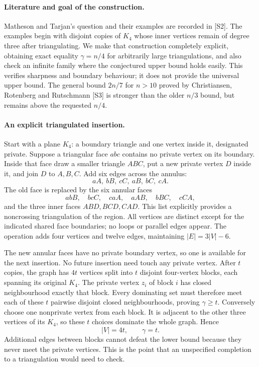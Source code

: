 \documentclass[11pt,a4paper]{article}
\begin{document}
\paragraph{Literature and goal of the construction.}
Matheson and Tarjan's question and their examples are recorded in [S2]. The examples begin with disjoint copies of $K_4$ whose inner vertices remain of degree three after triangulating. We make that construction completely explicit, obtaining exact equality $\gamma=n/4$ for arbitrarily large triangulations, and also check an infinite family where the conjectured upper bound holds easily. This verifies sharpness and boundary behaviour; it does not provide the universal upper bound. The general bound $2n/7$ for $n>10$ proved by Christiansen, Rotenberg and Rutschmann [S3] is stronger than the older $n/3$ bound, but remains above the requested $n/4$.

\paragraph{An explicit triangulated insertion.}
Start with a plane $K_4$: a boundary triangle and one vertex inside it, designated private. Suppose a triangular face $abc$ contains no private vertex on its boundary. Inside that face draw a smaller triangle $ABC$, put a new private vertex $D$ inside it, and join $D$ to $A,B,C$. Add six edges across the annulus:
\[
 aA,\ bB,\ cC,\ aB,\ bC,\ cA.
\]
The old face is replaced by the six annular faces
\[
 abB,\quad bcC,\quad caA,\quad aAB,\quad bBC,\quad cCA,
\]
and the three inner faces $ABD,BCD,CAD$. This list explicitly provides a noncrossing triangulation of the region. All vertices are distinct except for the indicated shared face boundaries; no loops or parallel edges appear. The operation adds four vertices and twelve edges, maintaining $|E|=3|V|-6$.

The new annular faces have no private boundary vertex, so one is available for the next insertion. No future insertion need touch any private vertex. After $t$ copies, the graph has $4t$ vertices split into $t$ disjoint four-vertex blocks, each spanning its original $K_4$. The private vertex $z_i$ of block $i$ has closed neighbourhood exactly that block. Every dominating set must therefore meet each of these $t$ pairwise disjoint closed neighbourhoods, proving $\gamma\ge t$. Conversely choose one nonprivate vertex from each block. It is adjacent to the other three vertices of its $K_4$, so these $t$ choices dominate the whole graph. Hence
\[
 |V|=4t,\qquad \gamma=t.
\]
Additional edges between blocks cannot defeat the lower bound because they never meet the private vertices. This is the point that an unspecified completion to a triangulation would need to check.
\end{document}
